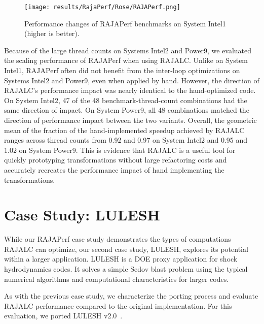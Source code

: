 \begin{figure}
\texttt{[image: results/RajaPerf/Rose/RAJAPerf.png]}
\caption{Performance changes of RAJAPerf benchmarks on System Intel1 (higher is better).}
\label{RAJAPerfPerf}
\end{figure}

Because of the large thread counts on Systems Intel2 and Power9, we evaluated the scaling performance of RAJAPerf when using RAJALC.
Unlike on System Intel1, RAJAPerf often did not benefit from the inter-loop
optimizations on Systems Intel2 and Power9, even when applied by hand. 
However, the direction of RAJALC's performance impact was nearly identical to the hand-optimized code. 
On System Intel2, 47 of the 48 benchmark-thread-count combinations had the same direction of impact.
On System Power9, all 48 combinations matched the direction of performance impact between the two variants.
Overall, the geometric mean of the fraction of the hand-implemented speedup achieved by RAJALC ranges across thread counts from 0.92 and 0.97 on System Intel2 and 0.95 and 1.02 on System Power9. 
This is evidence that RAJALC is a useful tool for quickly prototyping transformations without large refactoring costs and accurately recreates the performance impact of hand implementing the transformations.


\section{Case Study: LULESH}

While our RAJAPerf case study demonstrates the types of computations RAJALC
can optimize, our second case study, LULESH, explores its potential within a
larger application.
LULESH is a DOE proxy application for shock hydrodynamics codes.
It solves a simple Sedov blast problem using the typical numerical algorithms and computational characteristics for larger codes.

As with the previous case study, we characterize the porting process and
evaluate RAJALC performance compared to the original implementation.
For this evaluation, we ported LULESH v2.0~\cite{LULESH2}. 

